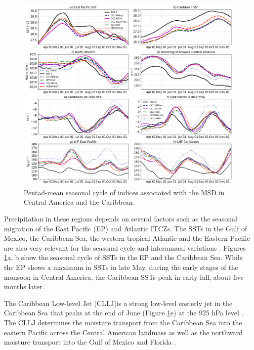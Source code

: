  
 \begin{figure}[t!]
\includegraphics[width=\linewidth]{figures/CSST}
\caption{Pentad-mean seasonal cycle of indices associated with the MSD in Central America and the Caribbean.}
\label{fig:csst}
\end{figure}

Precipitation in these regions depends on several factors such as the seasonal migration of the East Pacific (EP) and Atlantic ITCZs. The SSTs in the Gulf of Mexico, the Caribbean Sea, the western tropical Atlantic and the Eastern Pacific are also very relevant for the seasonal cycle and interannual variations \citep{magana1999,amador2008,straffon2019}. Figures \ref{fig:csst}a, b show the seasonal cycle of SSTs in the EP and the Caribbean Sea. While the EP shows a maximum in SSTs in late May, during the early stages of the monsoon in Central America, the Caribbean SSTs peak in early fall, about five months later. 


The Caribbean Low-level Jet (CLLJ)is a strong low-level easterly jet in the Caribbean Sea that peaks at the end of June (Figure \ref{fig:csst}e) at the 925 hPa level \citep{amador2008,herrera2015,maldonado2016}. The CLLJ  determines the moisture transport from the Caribbean Sea into the eastern Pacific across the Central American landmass as well as the northward moisture transport into the Gulf of Mexico and Florida \citep{munoz2008,hidalgo2015,maldonado2016}.


